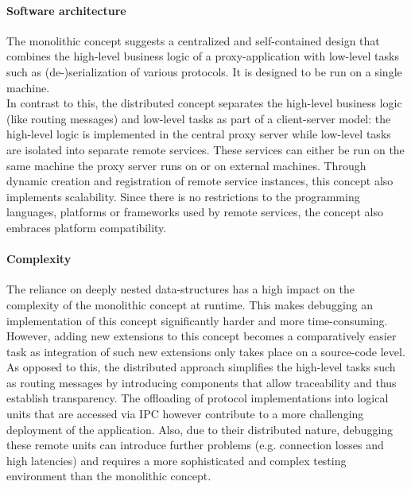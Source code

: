 \paragraph{Software architecture}
The monolithic concept suggests a centralized and self-contained design that combines the high-level business logic of a proxy-application with low-level tasks such as (de-)serialization of various protocols. It is designed to be run on a single machine.\\
In contrast to this, the distributed concept separates the high-level business logic (like routing messages) and low-level tasks as part of a client-server model: the high-level logic is implemented in the central proxy server while low-level tasks are isolated into separate remote services. These services can either be run on the same machine the proxy server runs on or on external machines. Through dynamic creation and registration of remote service instances, this concept also implements scalability. Since there is no restrictions to the programming languages, platforms or frameworks used by remote services, the concept also embraces platform compatibility.
\paragraph{Complexity}
The reliance on deeply nested data-structures has a high impact on the complexity of the monolithic concept at runtime. This makes debugging an implementation of this concept significantly harder and more time-consuming. However, adding new extensions to this concept becomes a comparatively easier task as integration of such new extensions only takes place on a source-code level.\\
As opposed to this, the distributed approach simplifies the high-level tasks such as routing messages by introducing components that allow traceability and thus establish transparency. The offloading of protocol implementations into logical units that are accessed via \ac{IPC} however contribute to a more challenging deployment of the application. Also, due to their distributed nature, debugging these remote units can introduce further problems (e.g. connection losses and high latencies) and requires a more sophisticated and complex testing environment than the monolithic concept.

